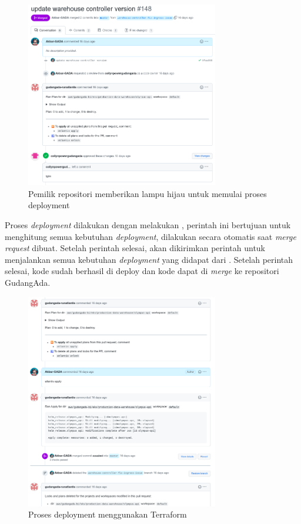 \begin{figure}
	\centering
	\includegraphics[width=0.75\textwidth]{pics/github-lgtm.png}
	\caption{Pemilik repositori memberikan lampu hijau untuk memulai proses deployment}
	\label{fig:githubLGTM}
\end{figure}

Proses \textit{deployment} dilakukan dengan melakukan , perintah ini bertujuan untuk menghitung semua kebutuhan \textit{deployment},  dilakukan secara otomatis saat \textit{merge request} dibuat. Setelah perintah  selesai, akan dikirimkan perintah  untuk menjalankan semua kebutuhan \textit{deployment} yang didapat dari . Setelah perintah  selesai, kode sudah berhasil di deploy dan kode dapat di \textit{merge} ke repositori GudangAda.

\begin{figure}
	\centering
	\includegraphics[width=0.75\textwidth]{pics/github-merge.png}
	\caption{Proses deployment menggunakan Terraform}
	\label{fig:githubMerge}
\end{figure}